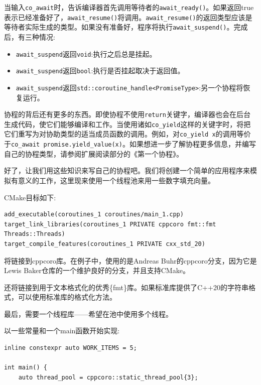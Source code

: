 当输入\texttt{co\_await}时，告诉编译器首先调用等待者的\texttt{await\_ready()}。如果返回true表示已经准备好了，\texttt{await\_resume()}将调用。\texttt{await\_resume()}的返回类型应该是等待者实际生成的类型。如果没有准备好，程序将执行\texttt{await\_suspend()}。完成后，有三种情况:

\begin{itemize}
\item 
\texttt{await\_suspend}返回\texttt{void}:执行之后总是挂起。

\item 
\texttt{await\_suspend}返回\texttt{bool}:执行是否挂起取决于返回值。

\item 
\texttt{await\_suspend}返回\texttt{std::coroutine\_handle<PromiseType>}:另一个协程将恢复运行。
\end{itemize}

协程的背后还有更多的东西。即使协程不使用\texttt{return}关键字，编译器也会在后台生成代码，使它们能够编译和工作。当使用诸如\texttt{co\_yield}这样的关键字时，将把它们重写为对协助类型的适当成员函数的调用。例如，对\texttt{co\_yield x}的调用等价于\texttt{co\_await promise.yield\_value(x)}。如果想进一步了解协程更多信息，并编写自己的协程类型，请参阅扩展阅读部分的《第一个协程》。

好了，让我们用这些知识来写自己的协程吧。我们将创建一个简单的应用程序来模拟有意义的工作，这里现来使用一个线程池来用一些数字填充向量。

CMake目标如下:

\begin{lstlisting}[style=styleCMake]
add_executable(coroutines_1 coroutines/main_1.cpp)
target_link_libraries(coroutines_1 PRIVATE cppcoro fmt::fmt
Threads::Threads)
target_compile_features(coroutines_1 PRIVATE cxx_std_20)
\end{lstlisting}

将链接到cppcoro库。在例子中，使用的是Andreas Buhr的cppcoro分支，因为它是Lewis Baker仓库的一个维护良好的分支，并且支持CMake。

还将链接到用于文本格式化的优秀\{fmt\}库。如果标准库提供了C++20的字符串格式，可以使用标准库的格式化方法。

最后，需要一个线程库——希望在池中使用多个线程。

以一些常量和一个main函数开始实现:

\begin{lstlisting}[style=styleCXX]
inline constexpr auto WORK_ITEMS = 5;

int main() {
	auto thread_pool = cppcoro::static_thread_pool{3};
\end{lstlisting}


